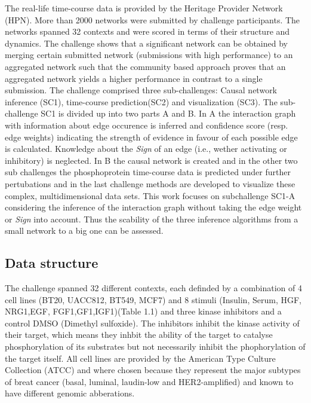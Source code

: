 The real-life time-course data is provided by the Heritage Provider Network (HPN). More than 2000 networks were submitted by challenge participants. The networks spanned 32 contexts and were scored in terms of their structure and dynamics. 
The challenge shows that a significant network can be obtained by merging certain submitted network (submissions with high performance) to an aggregated network such that the community based approach proves that an aggregated network yields a higher performance in contrast to a single submission.
The challenge comprised three sub-challenges: Causal network inference (SC1), time-course prediction(SC2) and visualization (SC3).
The sub-challenge SC1 is divided up into two parts A and B. In A the interaction graph with information about edge occurence is inferred and confidence score (resp. edge weights) indicating the strength of evidence in favour of each possible edge is calculated. Knowledge about the \textit{Sign} of an edge (i.e., wether activating or inhibitory) is neglected. In B the causal network is created and in the other two sub challenges the phosphoprotein time-course data is predicted under further pertubations and in the last challenge methods are developed to visualize these complex, multidimensional data sets. This work focuses on subchallenge SC1-A considering the inference of the interaction graph without taking the edge weight or \textit{Sign} into account. Thus the scability of the three inference algorithms from a small network to a big one can be assessed.

\subsection{Data structure}

The challenge spanned 32 different contexts, each definded by a combination of 4 cell lines (BT20, UACC812, BT549, MCF7) and 8 stimuli (Insulin, Serum, HGF, NRG1,EGF, FGF1,GF1,IGF1)(Table 1.1) and three kinase inhibitors and a control DMSO (Dimethyl sulfoxide). The inhibitors inhibit the kinase activity of their target, which means they inhbit the ability of the target to catalyse phosphorylation of its substrates but not necessarily inhibit the phophorylation of the target itself.
All cell lines are provided by the American Type Culture Collection (ATCC) and where chosen because they represent the major subtypes of breat cancer (basal, luminal, laudin-low and HER2-amplified) and known to have different genomic abberations. 

